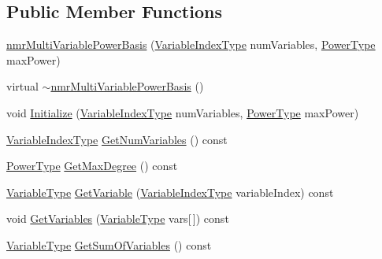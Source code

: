\subsection*{Public Member Functions}
\begin{DoxyCompactItemize}
\item 
\hyperlink{classnmr_multi_variable_power_basis_a727f2584bad937534d6eeca23ffbd3b0}{nmr\+Multi\+Variable\+Power\+Basis} (\hyperlink{classnmr_multi_variable_power_basis_ae125326a623043fcfd020aeeefd1cce6}{Variable\+Index\+Type} num\+Variables, \hyperlink{classnmr_multi_variable_power_basis_a2cb67df83e9fcac213848fa7a7295fcc}{Power\+Type} max\+Power)
\item 
virtual \hyperlink{classnmr_multi_variable_power_basis_ac361dfb96b564a860a61cefe72f43524}{$\sim$nmr\+Multi\+Variable\+Power\+Basis} ()
\item 
void \hyperlink{classnmr_multi_variable_power_basis_a22be51c2f0a788c36ac810e1d6763db3}{Initialize} (\hyperlink{classnmr_multi_variable_power_basis_ae125326a623043fcfd020aeeefd1cce6}{Variable\+Index\+Type} num\+Variables, \hyperlink{classnmr_multi_variable_power_basis_a2cb67df83e9fcac213848fa7a7295fcc}{Power\+Type} max\+Power)
\item 
\hyperlink{classnmr_multi_variable_power_basis_ae125326a623043fcfd020aeeefd1cce6}{Variable\+Index\+Type} \hyperlink{classnmr_multi_variable_power_basis_ade86b45873454555b8417a146e20f368}{Get\+Num\+Variables} () const 
\item 
\hyperlink{classnmr_multi_variable_power_basis_a2cb67df83e9fcac213848fa7a7295fcc}{Power\+Type} \hyperlink{classnmr_multi_variable_power_basis_a1772b3f297ffdc8f1ce69c1d43c9d6b8}{Get\+Max\+Degree} () const 
\item 
\hyperlink{classnmr_multi_variable_power_basis_a7089007a79cce8d2eb3672e2d61af06c}{Variable\+Type} \hyperlink{classnmr_multi_variable_power_basis_a7a85823d5207aa3b34417cd06dd33030}{Get\+Variable} (\hyperlink{classnmr_multi_variable_power_basis_ae125326a623043fcfd020aeeefd1cce6}{Variable\+Index\+Type} variable\+Index) const 
\item 
void \hyperlink{classnmr_multi_variable_power_basis_a845d31e9089294a04516bfcd03633d9a}{Get\+Variables} (\hyperlink{classnmr_multi_variable_power_basis_a7089007a79cce8d2eb3672e2d61af06c}{Variable\+Type} vars\mbox{[}$\,$\mbox{]}) const 
\item 
\hyperlink{classnmr_multi_variable_power_basis_a7089007a79cce8d2eb3672e2d61af06c}{Variable\+Type} \hyperlink{classnmr_multi_variable_power_basis_aad9a850d32b0f1babe1987cda49e4a1a}{Get\+Sum\+Of\+Variables} () const 

\end{DoxyCompactItemize}
